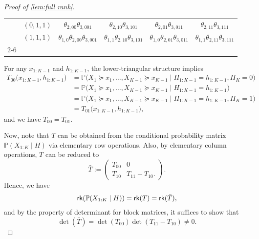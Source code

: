 \documentclass[10pt]{article} %
\newcommand{\PP}{\mathbb P}
\newcommand{\rk}{\textsf{\upshape rk}}
\begin{document}
\begin{proof}[Proof of \cref{lem:full rank}]
\begin{table}[h!]
\begin{tabular}{cc|cccc}
    & $(0, 1, 1)$ & $\theta_{2,00} \theta_{3,001}$ & $\theta_{2,10} \theta_{3,101}$ & $\theta_{2,01} \theta_{3,011}$ & $\theta_{2,11} \theta_{3,111}$ \\
    & $(1, 1, 1)$ & $\theta_{1,0} \theta_{2,00} \theta_{3,001}$ & $\theta_{1,1} \theta_{2,10} \theta_{3,101}$ & $\theta_{1,0} \theta_{2,01} \theta_{3,011}$ & $\theta_{1,1} \theta_{2,11} \theta_{3,111}$ \\
    \cmidrule{2-6}
    \end{tabular}
\end{table}
    
    
    \noindent For any $x_{1:K-1}$ and $h_{1:K-1}$, the lower-triangular structure implies
    \begin{align*}
        T_{00}\big(x_{1:K-1}, h_{1:K-1} \big) &= \PP \big(X_1 \succeq x_1, \ldots, X_{K-1} \succeq x_{K-1} \mid H_{1:K-1} = h_{1:K-1}, H_K = 0 \big) \\
        &= \PP \big(X_1 \succeq x_1, \ldots, X_{K-1} \succeq x_{K-1} \mid H_{1:K-1} = h_{1:K-1}\big) \\
        &= \PP \big(X_1 \succeq x_1, \ldots, X_{K-1} \succeq x_{K-1} \mid H_{1:K-1} = h_{1:K-1}, H_K = 1 \big) \\
        &= T_{01}\big(x_{1:K-1}, h_{1:K-1} \big),
    \end{align*}
    and we have $T_{00} = T_{01}$. 
    
    Now, note that $T$ can be obtained from the conditional probability matrix $\PP(X_{1:K} \mid H)$ via elementary row operations. Also, by elementary column operations, $T$ can be reduced to
    $$\bar{T} := \begin{pmatrix}
        T_{00} & 0 \\
        T_{10} & T_{11}-T_{10}.
    \end{pmatrix}.$$
    Hence, we have
    $$\rk(\PP(X_{1:K} \mid H)) = \rk(T) = \rk(\bar{T}),$$
    and by the property of determinant for block matrices, it suffices to show that $$\det(\bar{T}) = \det(T_{00}) \det(T_{11}-T_{10}) \neq 0.$$
    

\end{proof}
\end{document}
